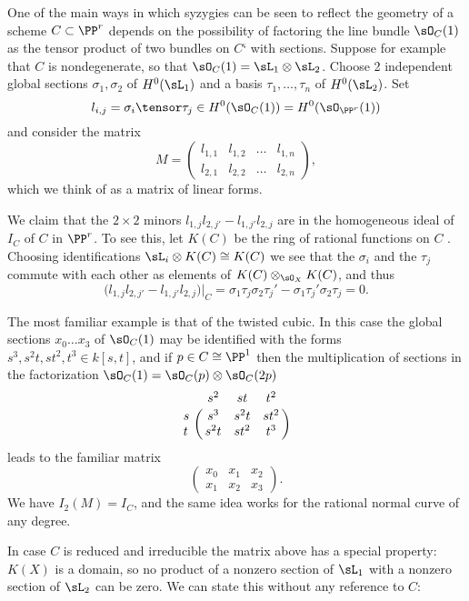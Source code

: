 One of the main ways in which syzygies can be seen to reflect the geometry of a scheme $C\subset \PP^r$
depends on the possibility of factoring the line bundle $\sO_C(1)$ as the tensor product of two bundles on $C$` with sections. Suppose for example that $C$ is nondegenerate, 
so that  $\sO_C(1) = \sL_1\otimes \sL_2$. Choose 2 independent global sections
$\sigma_1, \sigma_2$ of  $H^0(\sL_1)$ and a basis $\tau_1,\dots, \tau_n$ of $H^0(\sL_2)$. Set
$$
l_{i,j}= \sigma_i\tensor \tau_j \in H^0(\sO_C(1)) = H^0(\sO_{\PP^r}(1))
$$ and consider the matrix 
$$
M = 
\begin{pmatrix}
 l_{1,1}&l_{1,2}&\dots&l_{1,n}\\
  l_{2,1}&l_{2,2}&\dots&l_{2,n}
\end{pmatrix},
$$
which we think of as a matrix of linear forms. 

We claim that  the $2\times 2$ minors $l_{1,j} l_{2,j'}-l_{1,j'}l_{2,j}$ are in the homogeneous ideal of $I_C$ of $C$ in $\PP^r$. 
To see this,
let $K(C)$ be the ring of rational functions on $C$ . Choosing identifications $\sL_i\otimes K(C) \cong K(C)$ we see that the $\sigma_i$ and the $\tau_j$ commute with each other as elements of $K(C) \otimes_{\sO_X} K(C)$, and thus 
$$
\bigl(l_{1,j} l_{2,j'}-l_{1,j'}l_{2,j}\bigr)|_C = \sigma_1\tau_j\sigma_2\tau_j' - \sigma_1\tau_j'\sigma_2\tau_j =0.
$$

\begin{example}
The most familiar example is that of the twisted cubic. In this case the global sections $x_0\dots x_3$ of $\sO_C(1)$ may be identified with the forms $s^3, s^2t, st^2, t^3 \in k[s,t]$, and if $p\in C \cong \PP^1$ then the multiplication of sections
in the factorization  $\sO_C(1) = \sO_C(p) \otimes \sO_C(2p)$ 
$$
\bordermatrix{
 &s^2&st&t^2\cr
 s& s^3&s^2t&st^2\cr
 t& s^2t&st^2&t^3
}
$$
 leads to the familiar matrix
$$
\begin{pmatrix}
x_0&x_1&x_2\\
x_1&x_2&x_3 
\end{pmatrix}.
$$
We have $I_2(M) = I_C$, and the same idea works for the rational normal curve of any degree.
\end{example}

In case $C$ is reduced and irreducible the matrix above has a special property: $K(X)$ is a domain, so no product of a nonzero
section of $\sL_1$ with a nonzero section of $\sL_2$ can be zero. We can state this without any reference to $C$:

